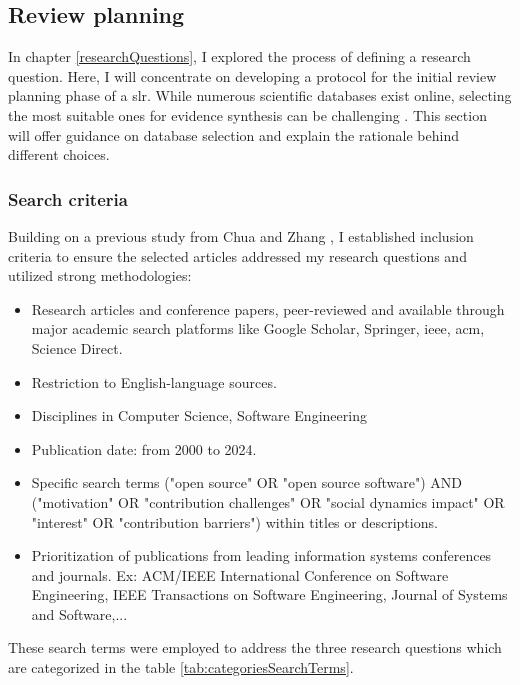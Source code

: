 \subsection{Review planning}

In chapter \ref{researchQuestions}, I explored the process of defining a research question. Here, I will concentrate on developing a protocol for the initial review planning phase of a \ac{slr}. While numerous scientific databases exist online, selecting the most suitable ones for evidence synthesis can be challenging \cite{academicSearchSystems}. This section will offer guidance on database selection and explain the rationale behind different choices.    



\subsubsection{Search criteria}
Building on a previous study from Chua and Zhang \cite{Chua_Zhang_2020}, I established inclusion criteria to ensure the selected articles addressed my research questions and utilized strong methodologies:

\begin{itemize}
    \item Research articles and conference papers, peer-reviewed and available through major academic search platforms like Google Scholar, Springer, \ac{ieee}, \ac{acm}, Science Direct.
    \item Restriction to English-language sources.
    \item Disciplines in Computer Science, Software Engineering
    \item Publication date: from 2000 to 2024.
    \item Specific search terms ("open source" OR "open source software") AND ("motivation" OR "contribution challenges" OR "social dynamics impact" OR "interest" OR "contribution barriers") within titles or descriptions.
    \item Prioritization of publications from leading information systems conferences and journals. Ex: ACM/IEEE International Conference on Software Engineering, IEEE Transactions on Software Engineering, Journal of Systems and Software,... 
\end{itemize}

These search terms were employed to address the three research questions which are categorized in the table \ref{tab:categoriesSearchTerms}.

